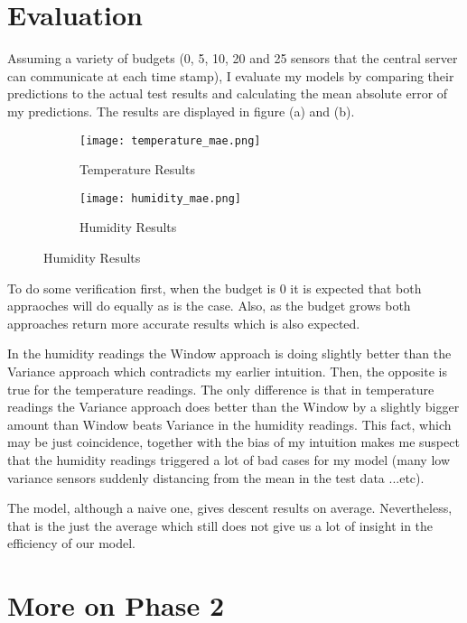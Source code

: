 \documentclass{article}
\begin{document}
\section{Evaluation}

Assuming a variety of budgets (0, 5, 10, 20 and 25
sensors that the central server can communicate at
each time stamp), I evaluate my models by comparing
their predictions to the actual test results and
calculating the mean absolute error of my
predictions. The results are displayed in figure (a)
and (b).

\begin{figure}[h!]
	\begin{subfigure}{\linewidth}
	\texttt{[image: temperature\_mae.png]}
	\caption{Temperature Results}
	\end{subfigure}
	\begin{subfigure}{\linewidth}
	\texttt{[image: humidity\_mae.png]}
	\caption{Humidity Results}
	\end{subfigure}
\end{figure}

\newpage

To do some verification first, when the budget is 0
it is expected that both appraoches will do equally
as is the case. Also, as the budget grows both
approaches return more accurate results which is
also expected.

In the humidity readings the Window approach is
doing slightly better than the Variance approach
which contradicts my earlier intuition. Then, the
opposite is true for the temperature readings.
The only difference is that in temperature readings
the Variance approach does better than the Window
by a slightly bigger amount than Window beats Variance
in the humidity readings. This fact, which may
be just coincidence, together with the bias of
my intuition makes me suspect that the humidity
readings triggered a lot of bad cases for my
model (many low variance sensors suddenly distancing
from the mean in the test data ...etc).

The model, although a naive one, gives descent
results on average. Nevertheless, that is the just
the average which still does not give us a lot of
insight in the efficiency of our model.

\section{More on Phase 2}
\end{document}
